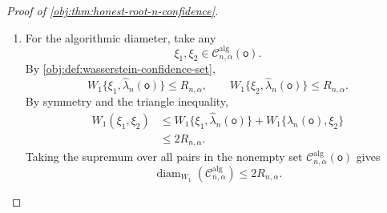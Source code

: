 \documentclass[11pt]{article}
\begin{document}
\begin{proof}[Proof of \cref{obj:thm:honest-root-n-confidence}]
\begin{enumerate}
\item For the algorithmic diameter, take any
\[
\xi_1,\xi_2\in\mathcal C^{\mathrm{alg}}_{n,\alpha}(\mathsf o).
\]
By \cref{obj:def:wasserstein-confidence-set},
\[
W_1\{\xi_1,\widehat\lambda_n(\mathsf o)\}\le R_{n,\alpha},
\qquad
W_1\{\xi_2,\widehat\lambda_n(\mathsf o)\}\le R_{n,\alpha}.
\]
By symmetry and the triangle inequality,
\[
\begin{aligned}
W_1(\xi_1,\xi_2)
&\le
W_1\{\xi_1,\widehat\lambda_n(\mathsf o)\}
+
W_1\{\widehat\lambda_n(\mathsf o),\xi_2\}  \\
&\le2R_{n,\alpha}.
\end{aligned}
\]
Taking the supremum over all pairs in the nonempty set \(\mathcal C^{\mathrm{alg}}_{n,\alpha}(\mathsf o)\) gives
\[
\operatorname{diam}_{W_1}(\mathcal C^{\mathrm{alg}}_{n,\alpha})
\le
2R_{n,\alpha}.
\]
\end{enumerate}
\end{proof}
\end{document}
